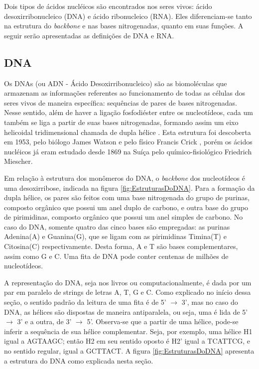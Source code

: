 \indent Dois tipos de ácidos nucléicos são encontrados nos seres vivos: ácido desoxirribonucleico (DNA) e ácido ribonucleico (RNA). Eles diferenciam-se tanto na estrutura do \textit{backbone} e nas bases nitrogenadas, quanto em suas funções. A seguir serão apresentadas as definições de DNA e RNA.

\subsection{DNA} \label{aceidosNucleicos:dna}

\indent Os DNAs (ou ADN - Ácido Desoxirribonucleico) são as biomoléculas que armazenam as informações referentes ao funcionamento de todas as células dos seres vivos de maneira específica: sequências de pares de bases nitrogenadas. Nesse sentido, além de haver a ligação fosfodiéster entre os nucleotídeos, cada um também se liga a partir de suas bases nitrogenadas, formando assim um eixo helicoidal tridimensional chamada de dupla hélice \cite{setubal97}. Esta estrutura foi descoberta em 1953, pelo biólogo James Watson e pelo físico Francis Crick \cite{dnadiscovery08}, porém os ácidos nucléicos já eram estudado desde 1869 na Suíça pelo químico-fisiológico Friedrich Miescher.

\indent Em relação à estrutura dos monômeros do DNA, o \textit{backbone} dos nucleotídeos é uma desoxirribose, indicada na figura \ref{fig:EstruturasDoDNA}. Para a formação da dupla hélice, os pares são feitos com uma base nitrogenada do grupo de purinas, composto orgânico que possui um anel duplo de carbono, e outra base do grupo de pirimidinas, composto orgânico que possui um anel simples de carbono. No caso do DNA, somente quatro das cinco bases são empregadas: as purinas Adenina(A) e Guanina(G), que se ligam com as pirimidinas Timina(T) e Citosina(C) respectivamente. Desta forma, A e T são bases complementares, assim como G e C. Uma fita de DNA pode conter centenas de milhões de nucleotídeos.

\indent A representação do DNA, seja nos livros ou computacionalmente, é dada por um par em paralelo de strings de letras A, T, G e C. Como explicado no início dessa seção, o sentido padrão da leitura de uma fita é de 5' $\rightarrow$ 3', mas no caso do DNA, as hélices são dispostas de maneira antiparalela, ou seja, uma é lida de 5' $\rightarrow$ 3' e a outra, de 3' $\rightarrow$ 5'. Observa-se que a partir de uma hélice, pode-se inferir a sequência de sua hélice complementar. Seja, por exemplo, uma hélice H1 igual a AGTAAGC; então H2 em seu sentido oposto é H2' igual a TCATTCG, e no sentido regular, igual a GCTTACT. A figura \ref{fig:EstruturasDoDNA} apresenta a estrutura do DNA como explicada nesta seção.

